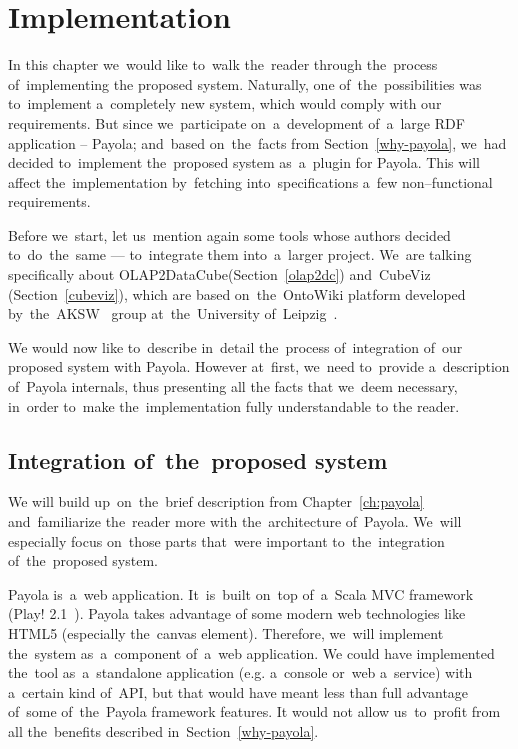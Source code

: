 \chapter{Implementation}
\label{ch:implementation}
In this chapter we~would like to~walk the~reader through the~process of~implementing 
the proposed system. Naturally, one of~the~possibilities was to~implement a~completely new system, 
which would comply with our requirements. But since we~participate on~a~development of~a~large RDF
application -- Payola; and~based on~the~facts from
Section~\ref{why-payola}, we~had decided to~implement the~proposed system as~a~plugin
for Payola. This will affect the~implementation by~fetching into~specifications a~few non--functional
requirements.

Before we~start, let us~mention again some tools whose authors decided to~do~the~same --- to~integrate them into~a~larger project. We~are talking specifically about 
OLAP2DataCube(Section~\ref{olap2dc}) and~CubeViz (Section~\ref{cubeviz}),
which are based on~the~OntoWiki platform developed by~the~AKSW~\cite{aksw} group at~the~University of~Leipzig~\cite{leipzich-uni}.

We would now like to~describe in~detail the~process of~integration of~our proposed system with
Payola. However at~first, we~need to~provide a~description of~Payola internals, thus presenting all
the facts that we~deem necessary, in~order to~make the~implementation fully understandable to
the reader.

\section{Integration of~the~proposed system}
We will build up~on~the~brief description from Chapter~\ref{ch:payola} and~familiarize the~reader
more with the~architecture of~Payola. We~will especially
focus on~those parts that~were important to~the~integration of~the~proposed system.

Payola is~a~web application. It~is~built on~top of~a~Scala MVC framework (Play! 2.1~\cite{playfw}).
Payola takes advantage of
some modern web technologies like HTML5 (especially the~canvas element).
Therefore, we~will implement the~system as~a~component of~a~web application.
We could have implemented the~tool as~a~standalone 
application (e.g. a~console or~web a~service) with a~certain kind of~API,
but that would have meant less than full advantage of~some of~the~Payola framework features.
It would not allow us~to~profit from all the~benefits described in~Section~\ref{why-payola}. 

